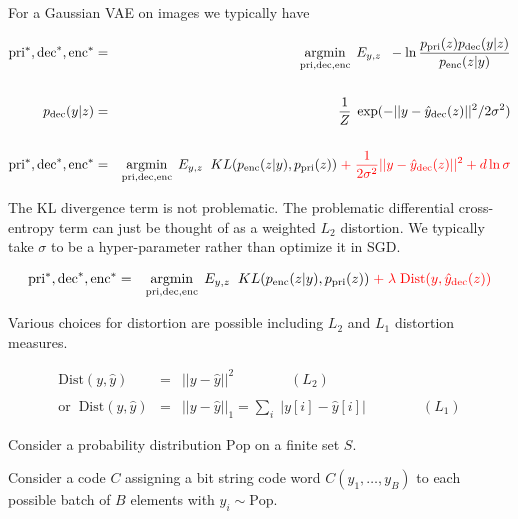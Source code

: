 {

For a Gaussian VAE on images we typically have

{\huge
\begin{eqnarray*}
\mathrm{pri}^*,\mathrm{dec}^*, \mathrm{enc}^* & = & \operatorname*{argmin}_{\mathrm{pri},\mathrm{dec},\mathrm{enc}}\; E_{y,z}\;\; - \ln \frac{p_{\mathrm{pri}}(z)p_{\mathrm{dec}}(y|z)}{p_{\mathrm{enc}}(z|y)}  \\
\\
p_{\mathrm{dec}}(y|z) & = & \frac{1}{Z}\;\exp(-||y-\hat{y}_{\mathrm{dec}}(z)||^2/2\sigma^2) \\
\\
\mathrm{pri}^*,\mathrm{dec}^*, \mathrm{enc}^* & = & \operatorname*{argmin}_{\mathrm{pri},\mathrm{dec},\mathrm{enc}}\; E_{y,z}\;\; KL(p_{\mathrm{enc}}(z|y),p_{\mathrm{pri}}(z))  \;{\color{red} +\; \frac{1}{2\sigma^2}||y-\hat{y}_{\mathrm{dec}}(z)||^2 + d\ln \sigma}
\end{eqnarray*}
}

The KL divergence term is not problematic. The problematic differential cross-entropy term can just be thought of as a weighted $L_2$ distortion.  We typically take $\sigma$ to be a hyper-parameter rather than optimize it in SGD.



{\huge
\begin{eqnarray*}
\mathrm{pri}^*,\mathrm{dec}^*, \mathrm{enc}^* & = & \operatorname*{argmin}_{\mathrm{pri},\mathrm{dec},\mathrm{enc}}\; E_{y,z}\;\; KL(p_{\mathrm{enc}}(z|y),p_{\mathrm{pri}}(z)) \;{\color{red} +\; \lambda\;\mathrm{Dist}(y,\hat{y}_{\mathrm{dec}}(z))}
\end{eqnarray*}
}

\vfill
Various choices for distortion are possible including $L_2$ and $L_1$ distortion measures.

\begin{eqnarray*}
\mathrm{Dist}(y,\hat{y}) & = & ||y-\hat{y}||^2 \hspace{4em}(L_2) \\
\\
\mathrm{or}\;\;\mathrm{Dist}(y,\hat{y}) & = & ||y-\hat{y}||_1 = \sum_i \;|y[i] - \hat{y}[i]| \hspace{4em}(L_1)
\end{eqnarray*}



}



Consider a probability distribution $\mathrm{Pop}$ on a finite set $S$.

\vfill
Consider a code $C$ assigning a bit string code word $C(y_1,\ldots,y_B)$ to each possible batch of $B$ elements with $y_i \sim \mathrm{Pop}$.

